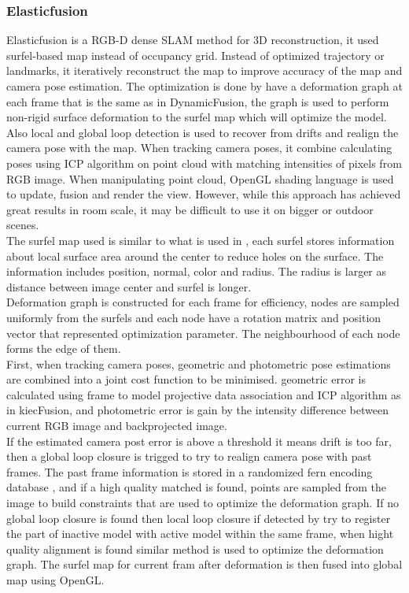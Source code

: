 \documentclass[12pt,twoside]{article}
\begin{document}
\subsubsection{Elasticfusion}
Elasticfusion\cite{whelan2015elasticfusion} is a RGB-D dense SLAM method for 3D reconstruction, it used surfel-based map instead of occupancy grid. Instead of optimized trajectory or landmarks, it iteratively reconstruct the map to improve accuracy of the map and camera pose estimation. The optimization is done by have a deformation graph at each frame that is the same as in DynamicFusion\citep{dynamic fusion}, the graph is used to perform non-rigid surface deformation to the surfel map which will optimize the model. Also local and global loop detection is used to recover from drifts and realign the camera pose with the map. When tracking camera poses, it combine calculating poses using ICP algorithm on point cloud with matching intensities of pixels from RGB image. When manipulating point cloud, OpenGL shading language is used to update, fusion and render the view. However, while this approach has achieved great results in room scale, it may be difficult to use it on bigger or outdoor scenes.\\
The surfel map used is similar to what is used in \citep{keller2013real}, each surfel stores information about local surface area around the center to reduce holes on the surface. The information includes position, normal, color and radius. The radius is larger as distance between image center and surfel is longer.\\
Deformation graph is constructed for each frame for efficiency, nodes are sampled uniformly from the surfels and each node have a rotation matrix and position vector that represented optimization parameter. The neighbourhood of each node forms the edge of them.\\
First, when tracking camera poses, geometric and photometric pose estimations are combined into a joint cost function to be minimised. geometric error is calculated using frame to model projective data association and ICP algorithm as in kiecFusion\citep{newcombe2011kinectfusion}, and photometric error is gain by the intensity difference between current RGB image and backprojected image.\\
If the estimated camera post error is above a threshold it means drift is too far, then a global loop closure is trigged to try to realign camera pose with past frames. The past frame information is stored in a randomized fern encoding database \cite{glocker2015real}, and if a high quality matched is found, points are sampled from the image to build constraints that are used to optimize the deformation graph. If no global loop closure is found then local loop closure if detected by try to register the part of inactive model with active model within the same frame, when hight quality alignment is found similar method is used to optimize the deformation graph. The surfel map for current fram after deformation is then fused into global map using OpenGL.\\
\end{document}
